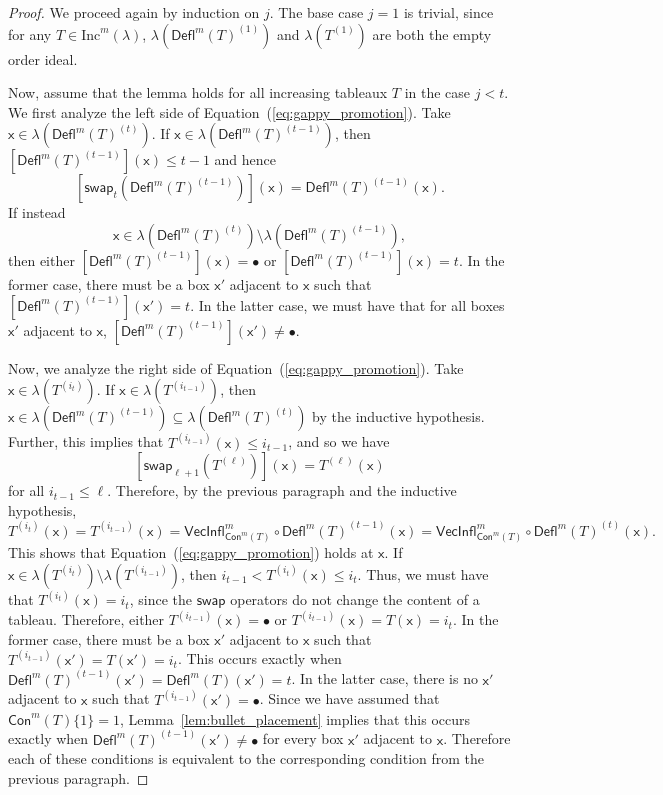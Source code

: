 \documentclass[12pt]{amsart}
\newcommand{\x}{\ensuremath{\mathsf{x}}}
\theoremstyle{definition}
\theoremstyle{remark}
\numberwithin{equation}{section}
\renewcommand{\emptyset}{\varnothing}
\newcommand{\inc}{\ensuremath{\mathrm{Inc}}}
\newcommand{\swap}{\ensuremath{\mathsf{swap}}}
\newcommand{\rep}{\ensuremath{\mathsf{Rep}}}
\newcommand{\deflate}{\ensuremath{\mathsf{Defl}}}
\newcommand{\inflate}{\ensuremath{\mathsf{VecInfl}}}
\newcommand{\content}{\ensuremath{\mathsf{Con}}}
\begin{document}
\begin{proof}  We proceed again by induction on $j$. The base case $j=1$ is trivial, since for any $T \in \inc^m(\lambda)$, $\lambda \left( \deflate^m(T)^{(1)} \right)$ and $\lambda \left( T^{(1)} \right)$ are both the empty order ideal.

Now, assume that the lemma holds for all increasing tableaux $T$ in the case $j < t$. We first analyze the left side of Equation~(\ref{eq:gappy_promotion}). Take $\x \in \lambda\left( \deflate^m(T)^{(t)} \right)$. If $\x \in \lambda\left( \deflate^m(T)^{(t-1)} \right)$, then 
$[\deflate^m(T)^{(t-1)}](\x) \leq t-1$ and hence
\[
\left[ \swap_{t}(\deflate^m(T)^{(t-1)})\right](\x) = \deflate^m(T)^{(t-1)}(\x).
\]
 If instead
 \[\x \in \lambda\left(\deflate^m(T)^{(t)}\right) \setminus \lambda\left(\deflate^m(T)^{(t-1)}\right),\]
  then either $[\deflate^m(T)^{(t-1)}](\x) = \bullet$ or $[\deflate^m(T)^{(t-1)}](\x) = t$. In the former case, there must be a box $\x'$ adjacent to $\x$ such that $[\deflate^m(T)^{(t-1)}](\x') = t$. In the latter case, we must have that for all boxes $\x'$ adjacent to $\x$, $[\deflate^m(T)^{(t-1)}](\x') \neq \bullet$. 

Now, we analyze the right side of Equation~(\ref{eq:gappy_promotion}). Take $\x \in \lambda\left( T^{(i_t)} \right)$.   If $\x \in \lambda \left(T^{(i_{t-1})} \right)$, then $\x \in \lambda(\deflate^m(T)^{(t-1)}) \subseteq \lambda(\deflate^m(T)^{(t)})$ by the inductive hypothesis. Further, this implies that $T^{(i_{t-1})}(\x) \leq i_{t-1}$,  and so we have
\[
\left[ \swap_{\ell+1} \left(T^{(\ell)} \right) \right](\x) = T^{(\ell)}(\x)
\]
 for all $i_{t-1} \leq \ell$. Therefore, by the previous paragraph and the inductive hypothesis,
 \[ T^{(i_t)}(\x) = T^{(i_{t-1})}(\x) = \inflate^m_{\content^m(T)} \circ \deflate^m(T)^{(t-1)}(\x) =  \inflate^m_{\content^m(T)} \circ \deflate^m(T)^{(t)}(\x). \] This shows that Equation~(\ref{eq:gappy_promotion}) holds at $\x$. If $\x \in \lambda \left(T^{(i_{t})} \right) \setminus \lambda \left(T^{(i_{t-1})} \right)$, then $i_{t-1} < T^{(i_{t})}(\x) \leq i_t$. Thus, we must have that $T^{(i_{t})}(\x) = i_{t}$, since the $\swap$ operators do not change the content of a tableau. Therefore, either $T^{(i_{t-1})}(\x) = \bullet$ or $T^{(i_{t-1})}(\x) =  T(\x) = i_{t}$. In the former case, there must be a box $\x'$ adjacent to $\x$ such that $T^{(i_{t-1})}(\x') = T(\x') = i_{t}$. This occurs exactly when $\deflate^m(T)^{(t-1)}(\x') = \deflate^m(T)(\x') = t$. In the latter case, there is no $\x'$ adjacent to $\x$ such that $T^{(i_{t-1})}(\x') = \bullet$. Since we have assumed that  $\content^m(T) \lbrace 1 \rbrace = 1$, Lemma~\ref{lem:bullet_placement} implies that this occurs exactly when  $\deflate^m(T)^{(t-1)}(\x') \neq \bullet$ for every box $\x'$ adjacent to $\x$. Therefore each of these conditions is equivalent to the corresponding condition from the previous paragraph. 
 

\end{proof}
\end{document}
